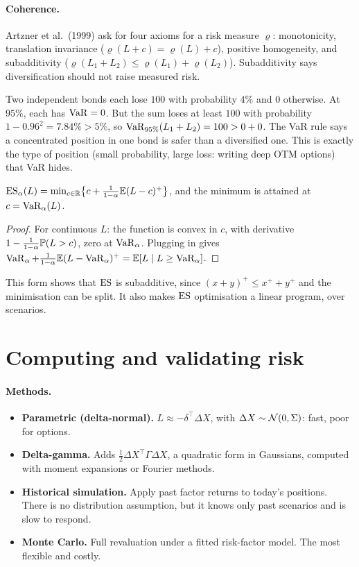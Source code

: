 \paragraph{Coherence.} Artzner et al.\ (1999) ask for four axioms for a risk measure $\varrho$: monotonicity, translation invariance ($\varrho(L+c)=\varrho(L)+c$), positive homogeneity, and subadditivity ($\varrho(L_1+L_2)\le\varrho(L_1)+\varrho(L_2)$). Subadditivity says diversification should not raise measured risk.

\begin{example}
Two independent bonds each lose $100$ with probability $4\%$ and $0$ otherwise. At $95\%$, each has $\operatorname{VaR}=0$. But the sum loses at least $100$ with probability $1-0.96^2=7.84\%>5\%$, so $\operatorname{VaR}_{95\%}(L_1+L_2)=100>0+0$. The VaR rule says a concentrated position in one bond is safer than a diversified one. This is exactly the type of position (small probability, large loss: writing deep OTM options) that VaR hides.
\end{example}

\begin{theorem}\label{thm:ru}
$\operatorname{ES}_\alpha(L)=\min_{c\in\mathbb{R}}\bigl\{c+\frac{1}{1-\alpha}\mathbb{E}(L-c)^+\bigr\}$, and the minimum is attained at $c=\operatorname{VaR}_\alpha(L)$.
\end{theorem}
\begin{proof}
For continuous $L$: the function is convex in $c$, with derivative $1-\frac{1}{1-\alpha}\mathbb{P}(L>c)$, zero at $\operatorname{VaR}_\alpha$. Plugging in gives $\operatorname{VaR}_\alpha+\frac{1}{1-\alpha}\mathbb{E}(L-\operatorname{VaR}_\alpha)^+=\mathbb{E}[L\mid L\ge\operatorname{VaR}_\alpha]$.
\end{proof}

This form shows that $\operatorname{ES}$ is subadditive, since $(x+y)^+\le x^++y^+$ and the minimisation can be split. It also makes $\operatorname{ES}$ optimisation a linear program, over scenarios.

\section{Computing and validating risk}

\paragraph{Methods.}
\begin{itemize}
\item \textbf{Parametric (delta-normal).} $L\approx-\delta^\top\Delta X$, with $\Delta X\sim\mathcal{N}(0,\Sigma)$: fast, poor for options.
\item \textbf{Delta-gamma.} Adds $\tfrac12\Delta X^\top\Gamma\Delta X$, a quadratic form in Gaussians, computed with moment expansions or Fourier methods.
\item \textbf{Historical simulation.} Apply past factor returns to today's positions. There is no distribution assumption, but it knows only past scenarios and is slow to respond.
\item \textbf{Monte Carlo.} Full revaluation under a fitted risk-factor model. The most flexible and costly.
\end{itemize}

